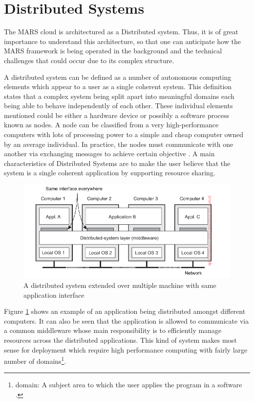 \section{Distributed Systems}

    The MARS cloud is architectured as a Distributed system. Thus, it is of great importance to understand
    this architecture, so that one can anticipate how the MARS framework is being operated in the background and
    the technical challenges that could occur due to its complex structure.
    \par
    A distributed system can be defined as a number of autonomous computing elements which 
    appear to a user as a single coherent system. 
    This definition states that a complex system being split apart into meaningful domains
    each being able to behave independently of each other. These individual elements 
    mentioned could be either a hardware device or possibly a software process known as nodes. A node can
    be classified from a very high-performance computers with lots of processing power to a simple and cheap computer owned by an average individual. 
    In practice, the nodes must communicate with one another via exchanging messages to achieve certain objective \cite[p.~2]{DistributedSystems}.
    A main characteristics of Distributed Systems are to make the user believe that the system is a single coherent application by supporting 
    resource sharing.

    \begin{figure}[htbp!]
        \centering \includegraphics[scale=0.94]{grafiken/distributedSystem.png}
        \caption{A distributed system extended over multiple machine with same application 
        interface \cite[p.~5]{DistributedSystems}}
        \label{fig:distributedSystem}
    \end{figure}

    \newpage
    \par
        Figure \ref{fig:distributedSystem} shows an example of an application being 
        distributed amongst different computers. It can also be seen that the application
        is allowed to communicate via a common middleware whose main responsibility is to
        efficiently manage resources across the distributed applications. This kind of system
        makes most sense for deployment which require high performance computing with fairly
        large number of domains\footnote{domain: A subject area to which the user applies the program in a 
        software \cite{DDD}.}.

